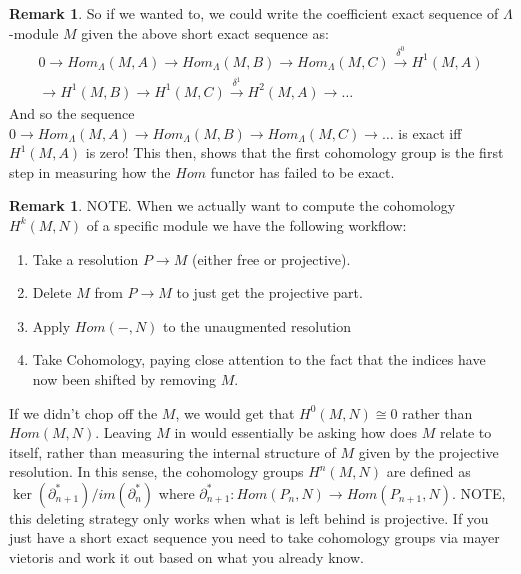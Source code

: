 \documentclass[12pt]{book}
\theoremstyle{definition}
\newtheorem{remark}[theorem]{Remark}
\begin{document}
\begin{remark}
    So if we wanted to, we could write the coefficient exact sequence of $\Lambda$-module $M$ given the above short exact sequence as: 
    \begin{align*}
        0 \rightarrow Hom_\Lambda(M,A) \rightarrow Hom_\Lambda(M, B) \rightarrow Hom_\Lambda(M,C) \xrightarrow{\delta^0} H^1(M, A)\\
        \rightarrow H^1(M, B) \rightarrow H^1(M,C) \xrightarrow{\delta^1} H^2(M, A) \rightarrow \dots 
    \end{align*}
    And so the sequence  $0 \rightarrow Hom_\Lambda(M,A) \rightarrow Hom_\Lambda(M, B) \rightarrow Hom_\Lambda(M,C) \rightarrow \dots$ is exact iff $H^1(M,A)$ is zero! This then, shows that the first cohomology group is the first step in measuring how the $Hom$ functor has failed to be exact. 
\end{remark}

\begin{remark}
    NOTE. When we actually want to compute the cohomology $H^k(M,N)$ of a specific module we have the following workflow: 
    \begin{enumerate}
        \item Take a resolution $P \to M$ (either free or projective).
        \item Delete $M$ from $P\to M$ to just get the projective part. 
        \item Apply $Hom(-,N)$ to the unaugmented resolution 
        \item Take Cohomology, paying close attention to the fact that the indices have now been shifted by removing $M$. 
    \end{enumerate}
    If we didn't chop off the $M$, we would get that $H^0(M,N) \cong 0$ rather than $Hom(M,N)$. Leaving $M$ in would essentially be asking how does $M$ relate to itself, rather than measuring the internal structure of $M$ given by the projective resolution. In this sense, the cohomology groups $H^n(M,N)$ are defined as $\ker(\partial^*_{n+1})/im(\partial^*_{n})$ where $\partial^*_{n+1}: Hom(P_{n},N) \to Hom(P_{n+1},N)$. NOTE, this deleting strategy only works when what is left behind is projective. If you just have a short exact sequence you need to take cohomology groups via mayer vietoris and work it out based on what you already know. 
\end{remark}
\end{document}

